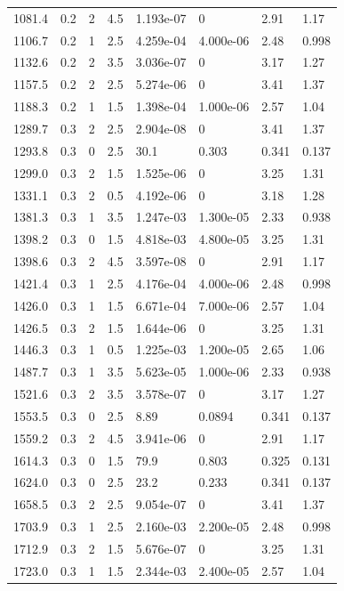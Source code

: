 \documentclass[preview]{standalone}
\begin{document}
{{{\begin{tabular}{L{1.2cm}C{1.2cm} C{0.3cm}C{0.5cm} C{1.4cm}C{1.4cm} C{1.4cm}C{1.4cm}}
  1081.4  &   0.2  & 2     & 4.5 &  1.193e-07  & 0  & 2.91 &  1.17   \\ 
  1106.7  &   0.2  & 1     & 2.5 &  4.259e-04  & 4.000e-06  & 2.48 &  0.998   \\ 
  1132.6  &   0.2  & 2     & 3.5 &  3.036e-07  & 0  & 3.17 &  1.27   \\ 
  1157.5  &   0.2  & 2     & 2.5 &  5.274e-06  & 0  & 3.41 &  1.37   \\ 
  1188.3  &   0.2  & 1     & 1.5 &  1.398e-04  & 1.000e-06  & 2.57 &  1.04   \\ 
  1289.7  &   0.3  & 2     & 2.5 &  2.904e-08  & 0  & 3.41 &  1.37   \\ 
  1293.8  &   0.3  & 0     & 2.5 &  30.1  & 0.303  & 0.341 &  0.137   \\ 
  1299.0  &   0.3  & 2     & 1.5 &  1.525e-06  & 0  & 3.25 &  1.31   \\ 
  1331.1  &   0.3  & 2     & 0.5 &  4.192e-06  & 0  & 3.18 &  1.28   \\ 
  1381.3  &   0.3  & 1     & 3.5 &  1.247e-03  & 1.300e-05  & 2.33 &  0.938   \\ 
  1398.2  &   0.3  & 0     & 1.5 &  4.818e-03  & 4.800e-05  & 3.25 &  1.31   \\ 
  1398.6  &   0.3  & 2     & 4.5 &  3.597e-08  & 0  & 2.91 &  1.17   \\ 
  1421.4  &   0.3  & 1     & 2.5 &  4.176e-04  & 4.000e-06  & 2.48 &  0.998   \\ 
  1426.0  &   0.3  & 1     & 1.5 &  6.671e-04  & 7.000e-06  & 2.57 &  1.04   \\ 
  1426.5  &   0.3  & 2     & 1.5 &  1.644e-06  & 0  & 3.25 &  1.31   \\ 
  1446.3  &   0.3  & 1     & 0.5 &  1.225e-03  & 1.200e-05  & 2.65 &  1.06   \\ 
  1487.7  &   0.3  & 1     & 3.5 &  5.623e-05  & 1.000e-06  & 2.33 &  0.938   \\ 
  1521.6  &   0.3  & 2     & 3.5 &  3.578e-07  & 0  & 3.17 &  1.27   \\ 
  1553.5  &   0.3  & 0     & 2.5 &  8.89  & 0.0894  & 0.341 &  0.137   \\ 
  1559.2  &   0.3  & 2     & 4.5 &  3.941e-06  & 0  & 2.91 &  1.17   \\ 
  1614.3  &   0.3  & 0     & 1.5 &  79.9  & 0.803  & 0.325 &  0.131   \\ 
  1624.0  &   0.3  & 0     & 2.5 &  23.2  & 0.233  & 0.341 &  0.137   \\ 
  1658.5  &   0.3  & 2     & 2.5 &  9.054e-07  & 0  & 3.41 &  1.37   \\ 
  1703.9  &   0.3  & 1     & 2.5 &  2.160e-03  & 2.200e-05  & 2.48 &  0.998   \\ 
  1712.9  &   0.3  & 2     & 1.5 &  5.676e-07  & 0  & 3.25 &  1.31   \\ 
  1723.0  &   0.3  & 1     & 1.5 &  2.344e-03  & 2.400e-05  & 2.57 &  1.04   \\ 
\hline 
\end{tabular} 

}}}
\end{document}
